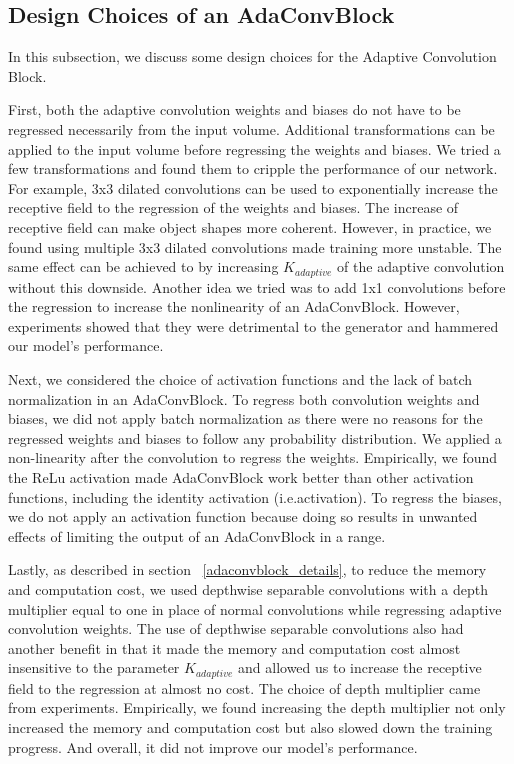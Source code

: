 \documentclass{article} %
\begin{document}
\subsection{Design Choices of an AdaConvBlock}
In this subsection, we discuss some design choices for the Adaptive Convolution Block. \par
First, both the adaptive convolution weights and biases do not have to be regressed necessarily from the input volume. Additional transformations can be applied to the input volume before regressing the weights and biases. We tried a few transformations and found them to cripple the performance of our network. For example, 3x3 dilated convolutions \citep{yu2015multi} can be used to exponentially increase the receptive field to the regression of the weights and biases. The increase of receptive field can make object shapes more coherent. However, in practice, we found using multiple 3x3 dilated convolutions made training more unstable. The same effect can be achieved to by increasing $K_{adaptive}$ of the adaptive convolution without this downside. Another idea we tried was to add 1x1 convolutions before the regression to increase the nonlinearity of an AdaConvBlock. However, experiments showed that they were detrimental to the generator and hammered our model's performance. \par
Next, we considered the choice of activation functions and the lack of batch normalization in an AdaConvBlock. To regress both convolution weights and biases, we did not apply batch normalization as there were no reasons for the regressed weights and biases to follow any probability distribution. We applied a non-linearity after the convolution to regress the weights. Empirically, we found the ReLu activation made AdaConvBlock work better than other activation functions, including the identity activation (i.e.\no activation). To regress the biases, we do not apply an activation function because doing so results in unwanted effects of limiting the output of an AdaConvBlock in a range. \par
Lastly, as described in section ~\ref{adaconvblock_details}, to reduce the memory and computation cost, we used depthwise separable convolutions with a depth multiplier equal to one in place of normal convolutions while regressing adaptive convolution weights. The use of depthwise separable convolutions also had another benefit in that it made the memory and computation cost almost insensitive to the parameter $K_{adaptive}$ and allowed us to increase the receptive field to the regression at almost no cost. The choice of depth multiplier came from experiments. Empirically, we found increasing the depth multiplier not only increased the memory and computation cost but also slowed down the training progress. And overall, it did not improve our model's performance. 
\end{document}
